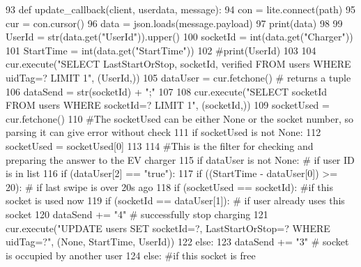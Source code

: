 \begin{DoxyCode}
93 \textcolor{keyword}{def }update_callback(client, userdata, message):
94     con = lite.connect(path)
95     cur = con.cursor()
96     data = json.loads(message.payload)
97     print(data)
98     
99     UserId = str(data.get(\textcolor{stringliteral}{"UserId"})).upper()
100     socketId = int(data.get(\textcolor{stringliteral}{"Charger"}))
101     StartTime = int(data.get(\textcolor{stringliteral}{"StartTime"}))
102     \textcolor{comment}{#print(UserId)}
103     
104     cur.execute(\textcolor{stringliteral}{"SELECT LastStartOrStop, socketId, verified FROM users WHERE uidTag=? LIMIT 1"}, (UserId,))
105     dataUser = cur.fetchone() \textcolor{comment}{# returns a tuple}
106     dataSend = str(socketId) + \textcolor{stringliteral}{";"}
107     
108     cur.execute(\textcolor{stringliteral}{"SELECT socketId FROM users WHERE socketId=? LIMIT 1"}, (socketId,))
109     socketUsed = cur.fetchone()
110     \textcolor{comment}{#The socketUsed can be either None or the socket number, so parsing it can give error without check}
111     \textcolor{keywordflow}{if} socketUsed \textcolor{keywordflow}{is} \textcolor{keywordflow}{not} \textcolor{keywordtype}{None}:
112         socketUsed = socketUsed[0]
113         
114     \textcolor{comment}{#This is the filter for checking and preparing the answer to the EV charger}
115     \textcolor{keywordflow}{if} dataUser \textcolor{keywordflow}{is} \textcolor{keywordflow}{not} \textcolor{keywordtype}{None}: \textcolor{comment}{# if user ID is in list}
116         \textcolor{keywordflow}{if} (dataUser[2] == \textcolor{stringliteral}{"true"}):
117             \textcolor{keywordflow}{if} ((StartTime - dataUser[0]) >= 20): \textcolor{comment}{# if last swipe is over 20s ago}
118                 \textcolor{keywordflow}{if} (socketUsed == socketId): \textcolor{comment}{#if this socket is used now}
119                     \textcolor{keywordflow}{if} (socketId == dataUser[1]): \textcolor{comment}{# if user already uses this socket}
120                         dataSend += \textcolor{stringliteral}{"4"} \textcolor{comment}{# successfully stop charging}
121                         cur.execute(\textcolor{stringliteral}{"UPDATE users SET socketId=?, LastStartOrStop=? WHERE uidTag=?"}, (\textcolor{keywordtype}{None},
       StartTime, UserId))
122                     \textcolor{keywordflow}{else}:
123                         dataSend += \textcolor{stringliteral}{"3"} \textcolor{comment}{# socket is occupied by another user }
124                 \textcolor{keywordflow}{else}: \textcolor{comment}{#if this socket is free}

\end{DoxyCode}
